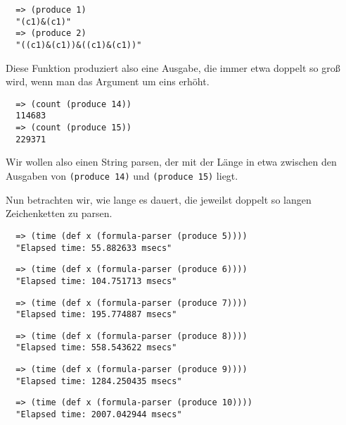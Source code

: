 \documentclass[ngerman,a4paper,abstracton,open=right,twoside=false,toc=listofnumbered,bibtotocnumbered]{scrreprt}
\begin{document}
\begin{lstlisting}
  => (produce 1)
  "(c1)&(c1)"
  => (produce 2)
  "((c1)&(c1))&((c1)&(c1))"
\end{lstlisting}

Diese Funktion produziert also eine Ausgabe, die immer etwa doppelt so groß wird, wenn man das Argument um eins erhöht.

\begin{lstlisting}
  => (count (produce 14))
  114683
  => (count (produce 15))
  229371
\end{lstlisting}

Wir wollen also einen String parsen, der mit der Länge in etwa zwischen den Ausgaben von \lstinline|(produce 14)| und \lstinline|(produce 15)| liegt.

Nun betrachten wir, wie lange es dauert, die jeweilst doppelt so langen Zeichenketten zu parsen.

\begin{lstlisting}
  => (time (def x (formula-parser (produce 5))))
  "Elapsed time: 55.882633 msecs"
\end{lstlisting}

\begin{lstlisting}
  => (time (def x (formula-parser (produce 6))))
  "Elapsed time: 104.751713 msecs"
\end{lstlisting}

\begin{lstlisting}
  => (time (def x (formula-parser (produce 7))))
  "Elapsed time: 195.774887 msecs"
\end{lstlisting}

\begin{lstlisting}
  => (time (def x (formula-parser (produce 8))))
  "Elapsed time: 558.543622 msecs"
\end{lstlisting}

\begin{lstlisting}
  => (time (def x (formula-parser (produce 9))))
  "Elapsed time: 1284.250435 msecs"
\end{lstlisting}

\begin{lstlisting}
  => (time (def x (formula-parser (produce 10))))
  "Elapsed time: 2007.042944 msecs"
\end{lstlisting}


\appendix
\end{document}
